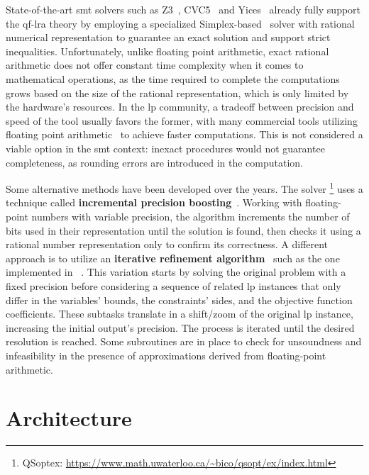 \documentclass[runningheads]{llncs}
\begin{document}
State-of-the-art \gls{smt} solvers such as Z3~\cite{ref:z3}, CVC5~\cite{ref:cvc5} and Yices~\cite{ref:yices} already fully support the \gls{qf-lra} theory
by employing a specialized Simplex-based~\cite{ref:simplex} solver with rational numerical representation to guarantee an exact solution and support strict inequalities.
Unfortunately, unlike floating point arithmetic, exact rational arithmetic does not offer constant time complexity when it comes to mathematical operations,
as the time required to complete the computations grows based on the size of the rational representation, which is only limited by the hardware's resources.
In the \gls{lp} community, a tradeoff between precision and speed of the tool usually favors the former, with many commercial tools utilizing floating point arithmetic~\cite{ref:gurobi} to achieve faster computations.
This is not considered a viable option in the \gls{smt} context: inexact procedures would not guarantee completeness, as rounding errors are introduced in the computation.

Some alternative methods have been developed over the years.
The \qsoptex solver \footnote{QSoptex: \url{https://www.math.uwaterloo.ca/~bico/qsopt/ex/index.html}} uses a technique called \textbf{incremental precision boosting}~\cite{ref:precision-boosting}.
Working with floating-point numbers with variable precision, the algorithm increments the number of bits used in their representation until the solution is found, then checks it using a rational number representation only to confirm its correctness.
A different approach is to utilize an \textbf{iterative refinement algorithm}~\cite{ref:iterative-refinement} such as the one implemented in \soplex~\cite{ref:soplex}.
This variation starts by solving the original problem with a fixed precision before considering a sequence of related \gls{lp} instances that only differ in the variables' bounds, the constraints' sides, and the objective function coefficients.
These subtasks translate in a shift/zoom of the original \gls{lp} instance, increasing the initial output's precision.
The process is iterated until the desired resolution is reached.
Some subroutines are in place to check for unsoundness and infeasibility in the presence of approximations derived from floating-point arithmetic.

\section{Architecture}
\label{sec:architecture}
\end{document}
